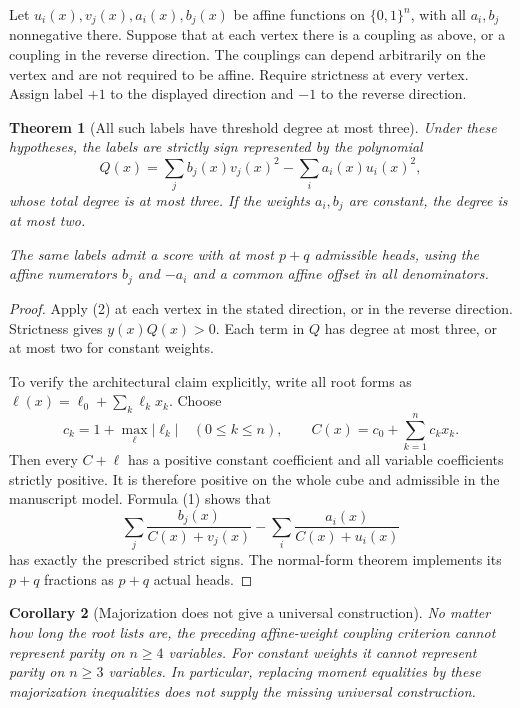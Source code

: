 \documentclass[11pt]{article}
\newtheorem{theorem}{Theorem}
\newtheorem{corollary}[theorem]{Corollary}
\newcommand{\Qn}{\{0,1\}^n}
\begin{document}
Let $u_i(x),v_j(x),a_i(x),b_j(x)$ be affine functions on $\Qn$,
with all $a_i,b_j$ nonnegative there. Suppose that at each vertex
there is a coupling as above, or a coupling in the reverse direction.
The couplings can depend arbitrarily on the vertex and are not required
to be affine. Require strictness at every vertex. Assign label $+1$
to the displayed direction and $-1$ to the reverse direction.

\begin{theorem}[All such labels have threshold degree at most three]
Under these hypotheses, the labels are strictly sign represented by
the polynomial
\[
               Q(x)=\sum_j b_j(x)v_j(x)^2
                            -\sum_i a_i(x)u_i(x)^2,
\]
whose total degree is at most three. If the weights $a_i,b_j$ are
constant, the degree is at most two.

The same labels admit a score with at most $p+q$ admissible heads,
using the affine numerators $b_j$ and $-a_i$ and a common affine
offset in all denominators.
\end{theorem}

\begin{proof}
Apply (2) at each vertex in the stated direction, or in the reverse
direction. Strictness gives $y(x)Q(x)>0$. Each term in $Q$ has
degree at most three, or at most two for constant weights.

To verify the architectural claim explicitly, write all root forms
as $\ell(x)=\ell_0+\sum_k\ell_kx_k$. Choose
\[
 c_k=1+\max_\ell|\ell_k| \quad(0\le k\le n),
             \qquad C(x)=c_0+\sum_{k=1}^n c_kx_k.
\]
Then every $C+\ell$ has a positive constant coefficient and all
variable coefficients strictly positive. It is therefore positive
on the whole cube and admissible in the manuscript model. Formula
(1) shows that
\[
          \sum_j\frac{b_j(x)}{C(x)+v_j(x)}
                -\sum_i\frac{a_i(x)}{C(x)+u_i(x)}
\]
has exactly the prescribed strict signs. The normal-form theorem
implements its $p+q$ fractions as $p+q$ actual heads.
\end{proof}

\begin{corollary}[Majorization does not give a universal construction]
No matter how long the root lists are, the preceding affine-weight
coupling criterion cannot represent parity on $n\ge4$ variables.
For constant weights it cannot represent parity on $n\ge3$ variables.
In particular, replacing moment equalities by these majorization
inequalities does not supply the missing universal construction.
\end{corollary}
\end{document}
